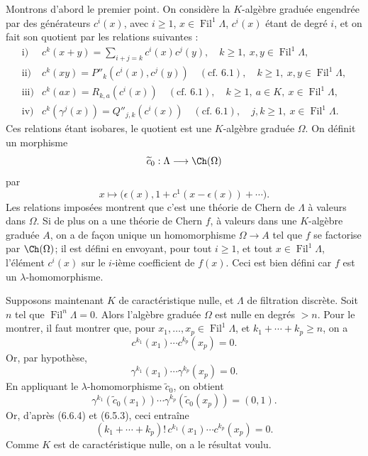 \documentclass[11pt]{article}
\newcommand{\Fil}{\operatorname{Fil}}
\begin{document}
Montrons d'abord le premier point. On considère la \(K\)-algèbre graduée engendrée par des générateurs \(c^i(x)\), avec \(i\ge1\), \(x\in\Fil^1\Lambda\), \(c^i(x)\) étant de degré \(i\), et on fait son quotient par les relations suivantes :
\[
\begin{array}{ll}
\text{i)}&
 c^k(x+y)=\displaystyle\sum_{i+j=k}c^i(x)c^j(y),
 \quad k\ge1,\ x,y\in\Fil^1\Lambda,\\[0.8em]
\text{ii)}&
 c^k(xy)=P''_k(c^i(x),c^j(y))
 \quad(\text{cf. }6.1),
 \quad k\ge1,\ x,y\in\Fil^1\Lambda,\\[0.4em]
\text{iii)}&
 c^k(ax)=R_{k,a}(c^i(x))
 \quad(\text{cf. }6.1),
 \quad k\ge1,\ a\in K,\ x\in\Fil^1\Lambda,\\[0.4em]
\text{iv)}&
 c^k(\gamma^j(x))=Q''_{j,k}(c^i(x))
 \quad(\text{cf. }6.1),
 \quad j,k\ge1,\ x\in\Fil^1\Lambda.
\end{array}
\]
Ces relations étant isobares, le quotient est une \(K\)-algèbre graduée \(\Omega\). On définit un morphisme
\[
  \widetilde c_0:\Lambda\longrightarrow \Ch(\Omega)
\]
par
\[
  x\longmapsto
  \bigl(\epsilon(x),1+c^1(x-\epsilon(x))+\cdots\bigr).
\]
Les relations imposées montrent que c'est une théorie de Chern de \(\Lambda\) à valeurs dans \(\Omega\). Si de plus on a une théorie de Chern \(f\), à valeurs dans une \(K\)-algèbre graduée \(A\), on a de façon unique un homomorphisme \(\Omega\to A\) tel que \(f\) se factorise par \(\Ch(\Omega)\); il est défini en envoyant, pour tout \(i\ge1\), et tout \(x\in\Fil^1\Lambda\), l'élément \(c^i(x)\) sur le \(i\)-ième coefficient de \(f(x)\). Ceci est bien défini car \(f\) est un \(\lambda\)-homomorphisme.

Supposons maintenant \(K\) de caractéristique nulle, et \(\Lambda\) de filtration discrète. Soit \(n\) tel que \(\Fil^n\Lambda=0\). Alors l'algèbre graduée \(\Omega\) est nulle en degrés \(>n\). Pour le montrer, il faut montrer que, pour \(x_1,\ldots,x_p\in\Fil^1\Lambda\), et \(k_1+\cdots+k_p\ge n\), on a
\[
  c^{k_1}(x_1)\cdots c^{k_p}(x_p)=0.
\]
Or, par hypothèse,
\[
  \gamma^{k_1}(x_1)\cdots\gamma^{k_p}(x_p)=0.
\]
En appliquant le \(\lambda\)-homomorphisme \(\widetilde c_0\), on obtient
\[
  \gamma^{k_1}(\widetilde c_0(x_1))\cdots
  \gamma^{k_p}(\widetilde c_0(x_p))=(0,1).
\]
Or, d'après (6.6.4) et (6.5.3), ceci entraîne
\[
  (k_1+\cdots+k_p)!\,
  c^{k_1}(x_1)\cdots c^{k_p}(x_p)=0.
\]
Comme \(K\) est de caractéristique nulle, on a le résultat voulu.
\end{document}
